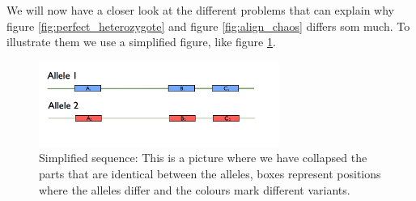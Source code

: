 We will now have a closer look at the different problems that can explain why figure \ref{fig:perfect_heterozygote} and figure \ref{fig:align_chaos} differs som much. To illustrate them we use a simplified figure, like figure \ref{fig:true_alleles}.

\begin{figure}[ht]
	\centering
		\includegraphics[width=0.7\textwidth]{../pictures/True_Alleles.png}
	\caption{Simplified sequence: This is a picture where we have collapsed the parts that are identical between the alleles, boxes represent positions where the alleles differ and the colours mark different variants.}
	\label{fig:true_alleles}
\end{figure}


